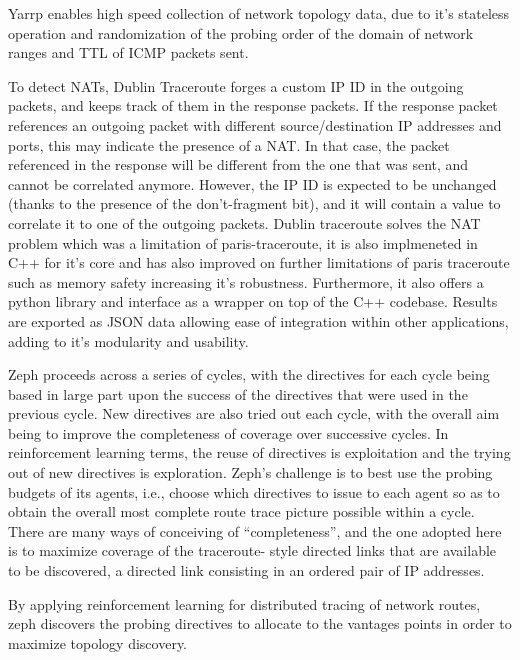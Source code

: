 Yarrp enables high speed collection of network topology data, due to it's stateless operation and randomization of the probing order of the domain of network ranges and TTL of ICMP packets sent.

To detect NATs, Dublin Traceroute forges a custom IP ID in the outgoing packets, and keeps track of them in the response packets. If the response packet references an outgoing packet with different source/destination IP addresses and ports, this may indicate the presence of a NAT. In that case, the packet referenced in the response will be different from the one that was sent, and cannot be correlated anymore. However, the IP ID is expected to be unchanged (thanks to the presence of the don't-fragment bit), and it will contain a value to correlate it to one of the outgoing packets.\cite{dublin_website} \cite{dublin}
Dublin traceroute solves the NAT problem which was a limitation of paris-traceroute, it is also implmeneted in C++ for it's core and has also improved on further limitations of paris traceroute such as memory safety increasing it's robustness. Furthermore, it also offers a python library and interface as a wrapper on top of the C++ codebase. Results are exported as JSON data allowing ease of integration within other applications, adding to it's modularity and usability.


Zeph proceeds across a series of cycles, with
the directives for each cycle being based in large part upon the
success of the directives that were used in the previous cycle. New
directives are also tried out each cycle, with the overall aim being
to improve the completeness of coverage over successive cycles. In
reinforcement learning terms, the reuse of directives is exploitation
and the trying out of new directives is exploration.
Zeph’s challenge is to best use the probing budgets of its agents,
i.e., choose which directives to issue to each agent so as to obtain
the overall most complete route trace picture possible within a
cycle. There are many ways of conceiving of “completeness”, and
the one adopted here is to maximize coverage of the traceroute-
style directed links that are available to be discovered, a directed
link consisting in an ordered pair of IP addresses.\cite{zephMap}

By applying reinforcement learning for distributed tracing of network routes, zeph discovers the probing directives to allocate to the vantages points in order to maximize topology discovery. 



